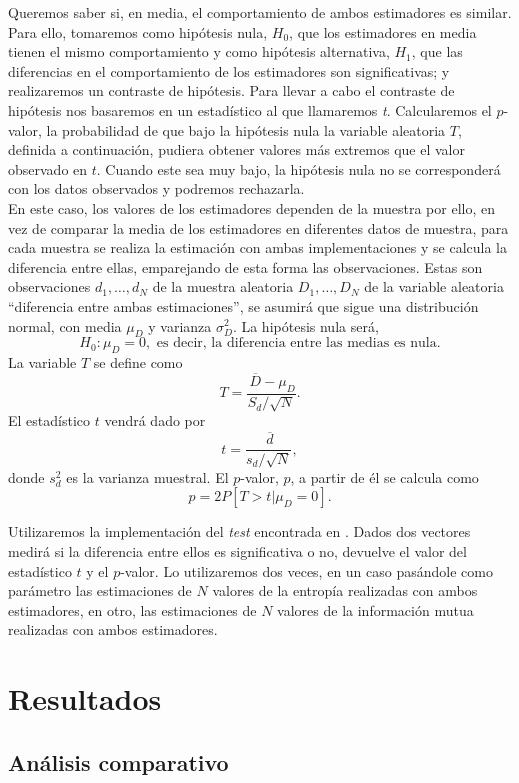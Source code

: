 \documentclass[12pt,a4paper]{report} %
\newcommand{\olsi}[1]{\,\overline{\!{#1}}} %
\theoremstyle{definition}
\begin{document}
Queremos saber si, en media, el comportamiento de ambos estimadores es similar. Para ello, tomaremos como hipótesis nula, $H_0$, que los estimadores en media tienen el mismo comportamiento y como hipótesis alternativa, $H_1$, que las diferencias en el comportamiento de los estimadores son significativas; y realizaremos un contraste de hipótesis. Para llevar a cabo el contraste de hipótesis nos basaremos en un estadístico al que llamaremos \textit{t}. Calcularemos el $p$-valor, la probabilidad de que bajo la hipótesis nula la variable aleatoria $T$, definida a continuación, pudiera obtener valores más extremos que el valor observado en $t$. Cuando este sea muy bajo, la hipótesis nula no se corresponderá con los datos observados y podremos rechazarla.\\

En este caso, los valores de los estimadores dependen de la muestra por ello, en vez de comparar la media de los estimadores en diferentes datos de muestra, para cada muestra se realiza la estimación con ambas implementaciones y se calcula la diferencia entre ellas, emparejando de esta forma las observaciones. Estas son observaciones $d_1,\dots,d_N$ de la muestra aleatoria $D_1,\dots, D_N$ de la variable aleatoria ``diferencia entre ambas estimaciones'', se asumirá que sigue una distribución normal, con media $\mu_D$ y varianza $\sigma^2_D$. La hipótesis nula será,\[
H_0: \mu_D = 0,\text{ es decir, la diferencia entre las medias es nula}.
\]
La variable $T$ se define como\[
T = \frac{\olsi{D} - \mu_D}{S_d/\sqrt{N}}.
\]
El estadístico $t$ vendrá dado por\[
t = \frac{\olsi{d}}{s_d/\sqrt{N}},
\]
donde $s^2_d$ es la varianza muestral. El $p$-valor, $p$, a partir de él se calcula como \[
p = 2 P \left [ T > t | \mu_D = 0 \right ]. 
\]

Utilizaremos la implementación del \textit{test} encontrada en \cite{ttest}. Dados dos vectores medirá si la diferencia entre ellos es significativa o no, devuelve el valor del estadístico $t$ y el $p$-valor. Lo utilizaremos dos veces, en un caso pasándole como parámetro las estimaciones de $N$ valores de la entropía realizadas con ambos estimadores, en otro, las estimaciones de $N$ valores de la información  mutua realizadas con ambos estimadores.

\chapter{Resultados}

\section{Análisis comparativo}
\end{document}

